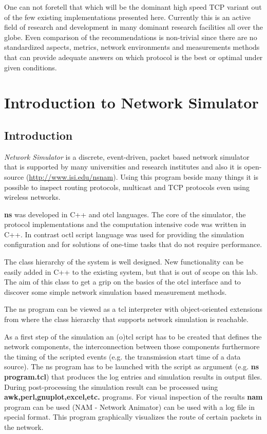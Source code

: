\documentclass[a4paper]{article}
\begin{document}
One can not foretell that which will be the dominant high speed TCP variant out of the few existing implementations
presented here. Currently this is an active field of research and development in many dominant research facilities all
over the globe. Even comparison of the recommendations is non-trivial since there are no standardized aspects, metrics,
network environments and measurements methods that can provide adequate answers on which protocol is the best or
optimal under given conditions.

\section{Introduction to Network Simulator}

\subsection{Introduction}

\emph{Network Simulator} is a discrete, event-driven, packet based network simulator that is supported by many universities and research institutes and also it is open-source (\url{http://www.isi.edu/nsnam}). Using this program beside many things it is possible to inspect routing protocols, multicast and TCP protocols even using wireless networks.

\textbf{ns} was developed in C++ and otcl languages. The core of the simulator, the protocol implementations and the computation intensive code was written in C++. In contrast octl script language was used for providing the simulation configuration and for solutions of one-time tasks that do not require performance.

The class hierarchy of the system is well designed. New functionality can be easily added in C++ to the existing system, but that is out of scope on this lab. The aim of this class to get a grip on the basics of the otcl interface and to discover some simple network simulation based measurement methods.

The ns program can be viewed as a tcl interpreter with object-oriented extensions from where the class hierarchy that supports network simulation is reachable.

As a first step of the simulation an (o)tcl script has to be created that defines the network components, the interconnection between those components furthermore the timing of the scripted events (e.g. the transmission start time of a data source). The ns program has to be launched with the script as argument (e.g. \textbf{ns program.tcl}) that produces the log entries and simulation results in output files. During post-processing the simulation result can be processed using \textbf{awk,perl,gnuplot,excel,etc.} programs. For visual inspection of the results \textbf{nam} program can be used (NAM - Network Animator) can be used with a log file in special format. This program graphically visualizes the route of certain packets in the network.
\end{document}
